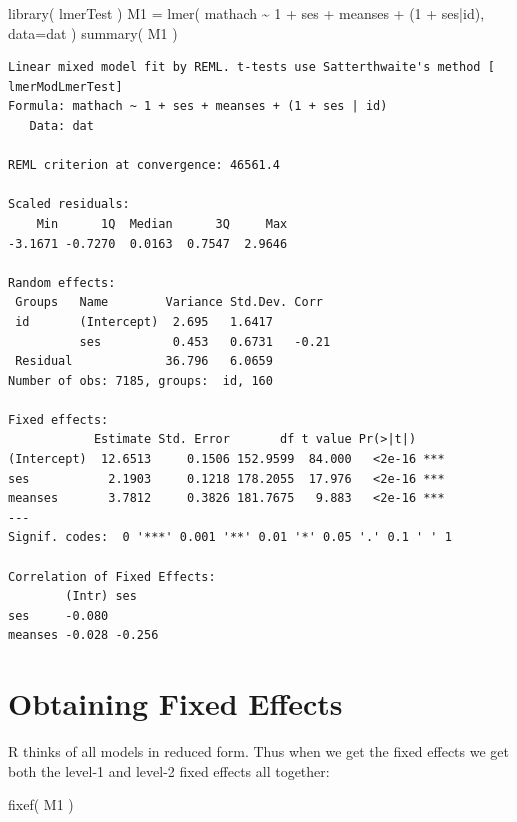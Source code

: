 \documentclass[
  letterpaper,
  DIV=11,
  numbers=noendperiod]{scrreprt}
\newenvironment{Shaded}{}{}
\newcommand{\AttributeTok}[1]{\textcolor[rgb]{0.49,0.56,0.16}{#1}}
\newcommand{\DecValTok}[1]{\textcolor[rgb]{0.25,0.63,0.44}{#1}}
\newcommand{\FunctionTok}[1]{\textcolor[rgb]{0.02,0.16,0.49}{#1}}
\newcommand{\NormalTok}[1]{#1}
\newcommand{\OtherTok}[1]{\textcolor[rgb]{0.00,0.44,0.13}{#1}}
\newcommand{\SpecialCharTok}[1]{\textcolor[rgb]{0.25,0.44,0.63}{#1}}
\begin{document}
\begin{Shaded}
\begin{Highlighting}[]
\FunctionTok{library}\NormalTok{( lmerTest )}
\NormalTok{M1 }\OtherTok{=} \FunctionTok{lmer}\NormalTok{( mathach }\SpecialCharTok{\textasciitilde{}} \DecValTok{1} \SpecialCharTok{+}\NormalTok{ ses }\SpecialCharTok{+}\NormalTok{ meanses }\SpecialCharTok{+}\NormalTok{ (}\DecValTok{1} \SpecialCharTok{+}\NormalTok{ ses}\SpecialCharTok{|}\NormalTok{id), }\AttributeTok{data=}\NormalTok{dat )}
\FunctionTok{summary}\NormalTok{( M1 )}
\end{Highlighting}
\end{Shaded}

\begin{verbatim}
Linear mixed model fit by REML. t-tests use Satterthwaite's method [
lmerModLmerTest]
Formula: mathach ~ 1 + ses + meanses + (1 + ses | id)
   Data: dat

REML criterion at convergence: 46561.4

Scaled residuals: 
    Min      1Q  Median      3Q     Max 
-3.1671 -0.7270  0.0163  0.7547  2.9646 

Random effects:
 Groups   Name        Variance Std.Dev. Corr 
 id       (Intercept)  2.695   1.6417        
          ses          0.453   0.6731   -0.21
 Residual             36.796   6.0659        
Number of obs: 7185, groups:  id, 160

Fixed effects:
            Estimate Std. Error       df t value Pr(>|t|)    
(Intercept)  12.6513     0.1506 152.9599  84.000   <2e-16 ***
ses           2.1903     0.1218 178.2055  17.976   <2e-16 ***
meanses       3.7812     0.3826 181.7675   9.883   <2e-16 ***
---
Signif. codes:  0 '***' 0.001 '**' 0.01 '*' 0.05 '.' 0.1 ' ' 1

Correlation of Fixed Effects:
        (Intr) ses   
ses     -0.080       
meanses -0.028 -0.256
\end{verbatim}

\section{Obtaining Fixed Effects}\label{obtaining-fixed-effects-1}

R thinks of all models in reduced form. Thus when we get the fixed
effects we get both the level-1 and level-2 fixed effects all together:

\begin{Shaded}
\begin{Highlighting}[]
\FunctionTok{fixef}\NormalTok{( M1 )}
\end{Highlighting}
\end{Shaded}
\end{document}
